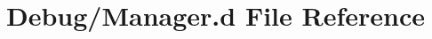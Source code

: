 \hypertarget{Debug_2Manager_8d}{}\section{Debug/\+Manager.d File Reference}
\label{Debug_2Manager_8d}

